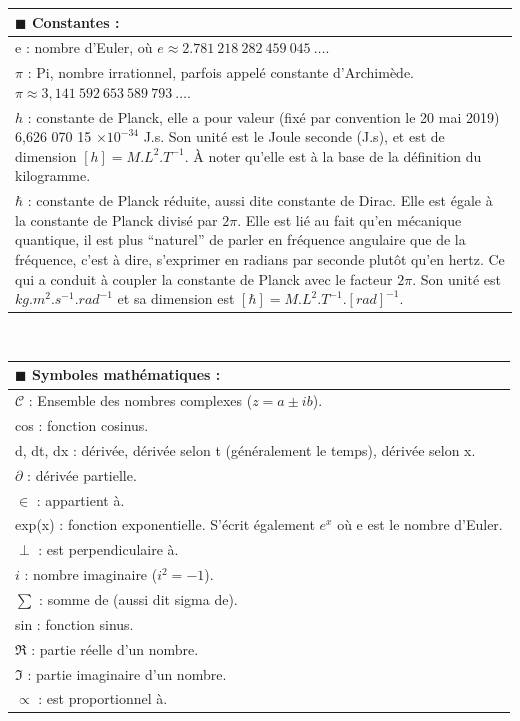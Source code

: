 \documentclass[12pt,a4paper,titlepage]{book}
\begin{document}
\begin{tabular}{|p{15cm}|}
\hline
$\blacksquare$ Constantes :\\
\hline
e : nombre d'Euler, où $e \approx 2.781~218~282~459~045~\ldots$.\\
$\pi$ : Pi, nombre irrationnel, parfois appelé constante d'Archimède. $\pi \approx 3,141~592~653~589~793~\ldots$.\\
$h$ : constante de Planck, elle a pour valeur (fixé par convention le 20 mai 2019) 6,626 070 15 $\times 10^{-34}$ J.s. Son unité est le Joule seconde (J.s), et est de dimension $[h] = M.L^2.T^{-1}$. À noter qu'elle est à la base de la définition du kilogramme.\\
$\hbar$ : constante de Planck réduite, aussi dite constante de Dirac. Elle est égale à la constante de Planck divisé par $2\pi$. Elle est lié au fait qu'en mécanique quantique, il est plus \enquote{naturel} de parler en fréquence angulaire que de la fréquence, c'est à dire, s'exprimer en radians par seconde plutôt qu'en hertz. Ce qui a conduit à coupler la constante de Planck avec le facteur $2\pi$. Son unité est $kg.m^2.s^{-1}.rad^{-1}$ et sa dimension est $[\hbar] = M.L^2.T^{-1}.[rad]^{-1}$.\\
\hline
\end{tabular}\\

\begin{tabular}{|p{15cm}|}
\hline
$\blacksquare$ Symboles mathématiques :\\
\hline
$\mathcal{C}$ : Ensemble des nombres complexes ($z = a \pm ib$).\\
cos : fonction cosinus.\\
d, dt, dx : dérivée, dérivée selon t (généralement le temps), dérivée selon x.\\
$\partial$ : dérivée partielle.\\
$\in$ : appartient à.\\
exp(x) : fonction exponentielle. S'écrit également $e^x$ où e est le nombre d'Euler.\\
$\perp$ : est perpendiculaire à.\\
$i$ : nombre imaginaire ($i^2 = -1$).\\
$\sum$ : somme de (aussi dit sigma de).\\
sin : fonction sinus.\\
$\Re$ : partie réelle d'un nombre.\\
$\Im$ : partie imaginaire d'un nombre.\\
$\propto$ : est proportionnel à.\\
\hline
\end{tabular}\\
\end{document}
